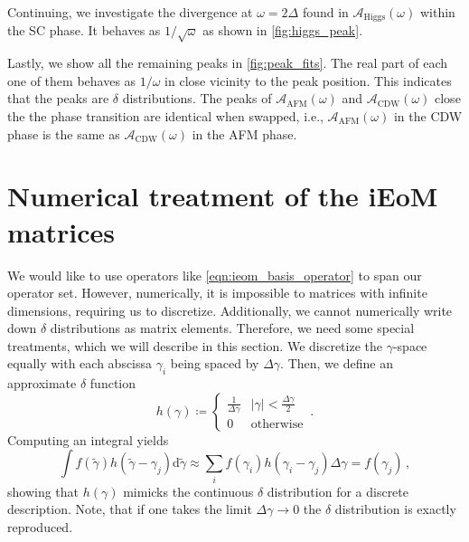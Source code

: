 \documentclass[
    reprint, 
    aps,
    preprintnumbers,
    twocolumn,
    prb,
    superscriptaddress
]{revtex4-2}
\newcommand{\spectral}[1]{\mathcal{A}_\text{#1}  (\omega)}
\begin{document}
Continuing, we investigate the divergence at $\omega = 2\Delta$ found in $\spectral{Higgs}$ within the SC phase.
It behaves as $1/\sqrt{\omega}$ as shown in \autoref{fig:higgs_peak}.

Lastly, we show all the remaining peaks in \autoref{fig:peak_fits}.
The real part of each one of them behaves as $1/\omega$ in close vicinity to the peak position.
This indicates that the peaks are $\delta$ distributions.
The peaks of $\spectral{AFM}$ and $\spectral{CDW}$ close the the phase transition are identical when swapped, i.e., $\spectral{AFM}$ in the CDW phase is the same as $\spectral{CDW}$ in the AFM phase.

\section{Numerical treatment of the iEoM matrices}
\label{sec:numerical_ieom}

We would like to use operators like \eqref{eqn:ieom_basis_operator} to span our operator set.
However, numerically, it is impossible to matrices with infinite dimensions, requiring us to discretize.
Additionally, we cannot numerically write down $\delta$ distributions as matrix elements. Therefore, we need some special treatments, which we will describe in this section.
We discretize the $\gamma$-space equally with each abscissa $\gamma_i$ being spaced by $\Delta \gamma$.
Then, we define an approximate $\delta$ function
\begin{equation}
    h(\gamma) \coloneqq \begin{cases}
        \frac{1}{\Delta \gamma} & |\gamma| < \frac{\Delta \gamma}{2} \\ 0 & \text{otherwise}
    \end{cases}\,.
\end{equation}
Computing an integral yields
\begin{equation}
    \int f(\tilde{\gamma}) h(\tilde{\gamma} - \gamma_j) \mathrm{d} \tilde{\gamma} \approx \sum_i f(\gamma_i) h(\gamma_i - \gamma_j) \Delta \gamma = f(\gamma_j)\,,
\end{equation}
showing that $h(\gamma)$ mimicks the continuous $\delta$ distribution for a discrete description.
Note, that if one takes the limit $\Delta \gamma \to 0$ the $\delta$ distribution is exactly reproduced.
\end{document}
